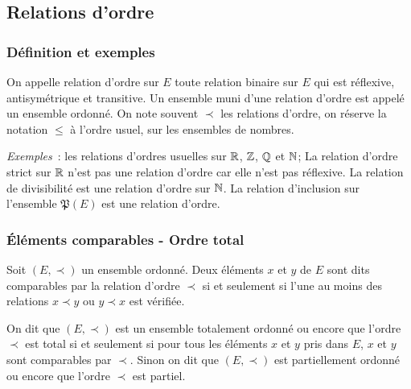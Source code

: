 \subsection{Relations d'ordre}
\label{chap3-subsec:relationdordre}
\subsubsection{Définition et exemples}
\label{chap3-subsubsec:relationordredef}
\begin{defdef}
On appelle relation d'ordre sur \(E\) toute relation binaire sur \(E\) qui est réflexive, antisymétrique et transitive. Un ensemble muni d'une relation d'ordre est appelé un ensemble ordonné. On note souvent \(\prec\) les relations d'ordre, on réserve la notation \(\leqslant\) à l'ordre usuel, sur les ensembles de nombres.
\end{defdef}

\emph{Exemples}~: les relations d'ordres usuelles sur \(\mathbb{R}\), \(\mathbb{Z}\), \(\mathbb{Q}\) et \(\mathbb{N}\); La relation d'ordre strict sur \(\mathbb{R}\) n'est pas une relation d'ordre car elle n'est pas réflexive. La relation de divisibilité est une relation d'ordre sur \(\mathbb{N}\). La relation d'inclusion sur l'ensemble \(\mathfrak{P}(E)\) est une relation d'ordre.
%
\subsubsection{Éléments comparables - Ordre total}
\label{chap3-subsubsec:ordretotal}
\begin{defdef}
Soit \((E, \prec)\) un ensemble ordonné. Deux éléments \(x\) et \(y\) de \(E\) sont dits comparables par la relation d'ordre \(\prec\) si et seulement si l'une au moins des relations \(x \prec y\) ou \(y \prec x\) est vérifiée.
\end{defdef}
\begin{defdef}
On dit que \((E, \prec)\) est un ensemble totalement ordonné ou encore que l'ordre \(\prec\) est total si et seulement si pour tous les éléments \(x\) et \(y\) pris dans \(E\), \(x\) et \(y\) sont comparables par \(\prec\). Sinon on dit que \((E,\prec)\) est partiellement ordonné ou encore que l'ordre \(\prec\) est partiel.
\end{defdef}
%
